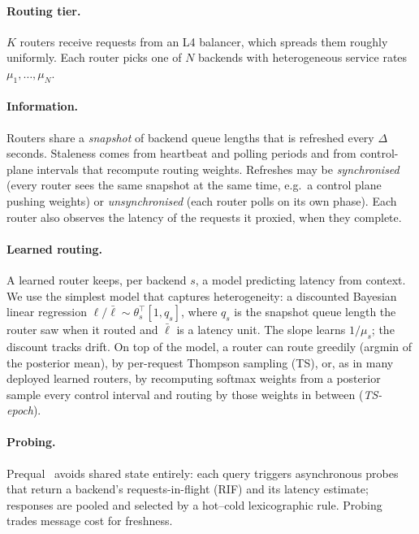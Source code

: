 \documentclass[10pt,twocolumn,letterpaper]{article}
\begin{document}
\paragraph{Routing tier.} $K$ routers receive requests from an L4 balancer,
which spreads them roughly uniformly. Each router picks one of $N$ backends
with heterogeneous service rates $\mu_1,\dots,\mu_N$.

\paragraph{Information.} Routers share a \emph{snapshot} of backend queue
lengths that is refreshed every $\Delta$ seconds. Staleness comes from
heartbeat and polling periods and from control-plane intervals that recompute
routing weights. Refreshes may be \emph{synchronised} (every router sees the
same snapshot at the same time, e.g.\ a control plane pushing weights) or
\emph{unsynchronised} (each router polls on its own phase). Each router also
observes the latency of the requests it proxied, when they complete.

\paragraph{Learned routing.} A learned router keeps, per backend $s$, a model
predicting latency from context. We use the simplest model that captures
heterogeneity: a discounted Bayesian linear regression
$\ell/\bar\ell \sim \theta_s^\top [1, q_s]$, where $q_s$ is the snapshot queue
length the router saw when it routed and $\bar\ell$ is a latency unit. The
slope learns $1/\mu_s$; the discount tracks drift. On top of the model, a
router can route greedily (argmin of the posterior mean), by per-request
Thompson sampling (TS), or, as in many deployed learned routers, by
recomputing softmax weights from a posterior sample every control interval
and routing by those weights in between (\emph{TS-epoch}).

\paragraph{Probing.} Prequal~\citep{prequal2024} avoids shared state entirely:
each query triggers asynchronous probes that return a backend's
requests-in-flight (RIF) and its latency estimate; responses are pooled and
selected by a hot--cold lexicographic rule. Probing trades message cost for
freshness.

\end{document}
